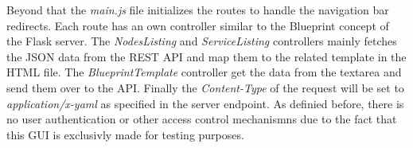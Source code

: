 Beyond that the \textit{main.js} file initializes the routes to handle the navigation bar redirects.
Each route has an own controller similar to the Blueprint concept of the Flask server.
The \textit{NodesListing} and \textit{ServiceListing} controllers mainly fetches the \ac{JSON} data from the \ac{REST} \ac{API} and map them to the related template in the \ac{HTML} file.
The \textit{BlueprintTemplate} controller get the data from the textarea and send them over to the \ac{API}.
Finally the \textit{Content-Type} of the request will be set to \textit{application/x-yaml} as specified in the server endpoint.
As definied before, there is no user authentication or other access control mechanismns due to the fact that this \ac{GUI} is exclusivly made for testing purposes.

